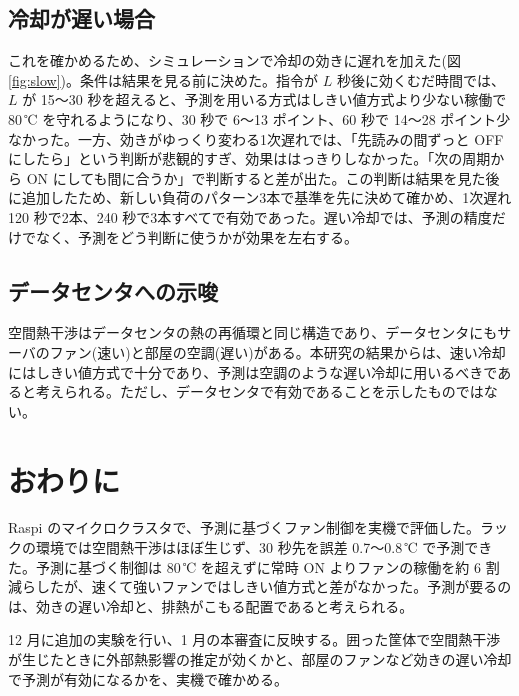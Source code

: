 \documentclass[10pt,uplatex,dvipdfmx,twocolumn]{jsarticle}
\begin{document}
\subsection{冷却が遅い場合}
これを確かめるため、シミュレーションで冷却の効きに遅れを加えた(図\ref{fig:slow})。条件は結果を見る前に決めた。指令が $L$ 秒後に効くむだ時間では、$L$ が 15〜30 秒を超えると、予測を用いる方式はしきい値方式より少ない稼働で 80\,℃ を守れるようになり、30 秒で 6〜13 ポイント、60 秒で 14〜28 ポイント少なかった。一方、効きがゆっくり変わる1次遅れでは、「先読みの間ずっと OFF にしたら」という判断が悲観的すぎ、効果ははっきりしなかった。「次の周期から ON にしても間に合うか」で判断すると差が出た。この判断は結果を見た後に追加したため、新しい負荷のパターン3本で基準を先に決めて確かめ、1次遅れ 120 秒で2本、240 秒で3本すべてで有効であった。遅い冷却では、予測の精度だけでなく、予測をどう判断に使うかが効果を左右する。

\subsection{データセンタへの示唆}
空間熱干渉はデータセンタの熱の再循環と同じ構造であり、データセンタにもサーバのファン(速い)と部屋の空調(遅い)がある。本研究の結果からは、速い冷却にはしきい値方式で十分であり、予測は空調のような遅い冷却に用いるべきであると考えられる。ただし、データセンタで有効であることを示したものではない。


\section{おわりに}
Raspi のマイクロクラスタで、予測に基づくファン制御を実機で評価した。ラックの環境では空間熱干渉はほぼ生じず、30 秒先を誤差 0.7〜0.8\,℃ で予測できた。予測に基づく制御は 80\,℃ を超えずに常時 ON よりファンの稼働を約 6 割減らしたが、速くて強いファンではしきい値方式と差がなかった。予測が要るのは、効きの遅い冷却と、排熱がこもる配置であると考えられる。

12 月に追加の実験を行い、1 月の本審査に反映する。囲った筐体で空間熱干渉が生じたときに外部熱影響の推定が効くかと、部屋のファンなど効きの遅い冷却で予測が有効になるかを、実機で確かめる。
\end{document}
